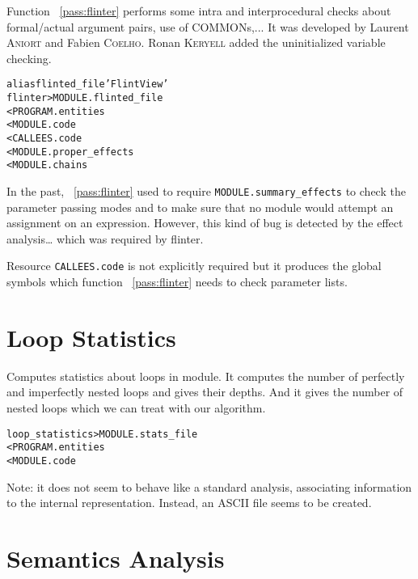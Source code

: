 \documentclass[a4paper]{report}
\newenvironment{PipsMake}{\begin{alltt}}{\end{alltt}}
\newcommand{\PipsPassRef}[1]{\texttt{\detokenize{#1}}~\ref{pass:#1}}
\newenvironment{PipsPass}[1]{\label{pass:#1}}{}
\begin{document}
\begin{PipsPass}{flinter}
Function \PipsPassRef{flinter} performs some intra and interprocedural checks
about formal/actual argument pairs, use of COMMONs,...
\end{PipsPass}
It was developed by
Laurent \textsc{Aniort} and Fabien \textsc{Coelho}. Ronan \textsc{Keryell}
added the uninitialized variable checking.

\begin{PipsMake}
alias flinted_file 'Flint View'
flinter                         > MODULE.flinted_file
        < PROGRAM.entities
        < MODULE.code
        < CALLEES.code
        < MODULE.proper_effects
        < MODULE.chains
\end{PipsMake}

In the past, \PipsPassRef{flinter} used to require \texttt{MODULE.summary\_effects}
to check the parameter passing modes and to make sure that no module would
attempt an assignment on an expression. However, this kind of bug is
detected by the effect analysis\dots{} which was required by flinter.

Resource \texttt{CALLEES.code} is not explicitly required but it produces the
global symbols which function \PipsPassRef{flinter} needs to check parameter lists.

\section{Loop Statistics}

Computes statistics about loops in module. It computes the number of
perfectly and imperfectly nested loops and gives their depths. And it gives
the number of nested loops which we can treat with our algorithm.

\begin{PipsMake}
loop_statistics > MODULE.stats_file
        < PROGRAM.entities
        < MODULE.code
\end{PipsMake}

Note: it does not seem to behave like a standard analysis, associating
information to the internal representation. Instead, an ASCII file
seems to be created.


\section{Semantics Analysis}
\label{subsection-semantics-analysis}
\end{document}
